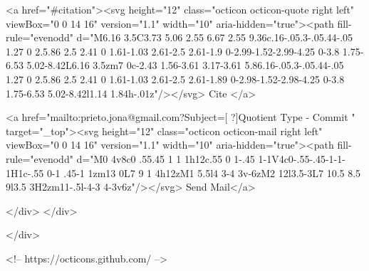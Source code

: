       <a  href="#citation"><svg height="12" class="octicon octicon-quote right left" viewBox="0 0 14 16" version="1.1" width="10" aria-hidden="true"><path fill-rule="evenodd" d="M6.16 3.5C3.73 5.06 2.55 6.67 2.55 9.36c.16-.05.3-.05.44-.05 1.27 0 2.5.86 2.5 2.41 0 1.61-1.03 2.61-2.5 2.61-1.9 0-2.99-1.52-2.99-4.25 0-3.8 1.75-6.53 5.02-8.42L6.16 3.5zm7 0c-2.43 1.56-3.61 3.17-3.61 5.86.16-.05.3-.05.44-.05 1.27 0 2.5.86 2.5 2.41 0 1.61-1.03 2.61-2.5 2.61-1.89 0-2.98-1.52-2.98-4.25 0-3.8 1.75-6.53 5.02-8.42l1.14 1.84h-.01z"/></svg> Cite
      </a>

      <a href="mailto:prieto.jona@gmail.com?Subject=[ ?]Quotient Type - Commit " target="_top"><svg height="12" class="octicon octicon-mail right left" viewBox="0 0 14 16" version="1.1" width="10" aria-hidden="true"><path fill-rule="evenodd" d="M0 4v8c0 .55.45 1 1 1h12c.55 0 1-.45 1-1V4c0-.55-.45-1-1-1H1c-.55 0-1 .45-1 1zm13 0L7 9 1 4h12zM1 5.5l4 3-4 3v-6zM2 12l3.5-3L7 10.5 8.5 9l3.5 3H2zm11-.5l-4-3 4-3v6z"/></svg> Send Mail</a>

    </div>
  </div>

</div>

<!-- https://octicons.github.com/ -->






